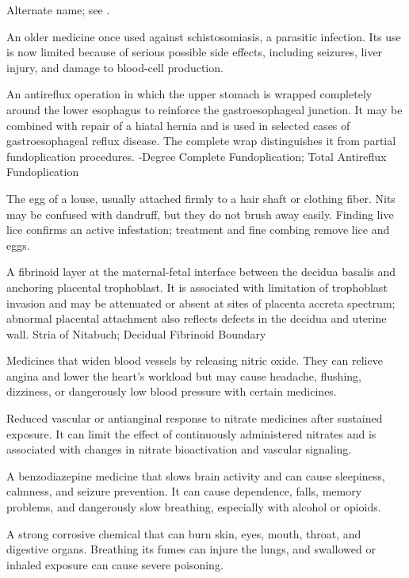  Alternate name; see .

 An older medicine once used against schistosomiasis, a parasitic infection. Its use is now limited because of serious possible side effects, including seizures, liver injury, and damage to blood-cell production.

 An antireflux operation in which the upper stomach is wrapped completely around the lower esophagus to reinforce the gastroesophageal junction. It may be combined with repair of a hiatal hernia and is used in selected cases of gastroesophageal reflux disease. The complete wrap distinguishes it from partial fundoplication procedures.
-Degree Complete Fundoplication; Total Antireflux Fundoplication

 The egg of a louse, usually attached firmly to a hair shaft or clothing fiber. Nits may be confused with dandruff, but they do not brush away easily. Finding live lice confirms an active infestation; treatment and fine combing remove lice and eggs.

 A fibrinoid layer at the maternal-fetal interface between the decidua basalis and anchoring placental trophoblast. It is associated with limitation of trophoblast invasion and may be attenuated or absent at sites of placenta accreta spectrum; abnormal placental attachment also reflects defects in the decidua and uterine wall.
\synonyms
Stria of Nitabuch; Decidual Fibrinoid Boundary

 Medicines that widen blood vessels by releasing nitric oxide. They can relieve angina and lower the heart's workload but may cause headache, flushing, dizziness, or dangerously low blood pressure with certain medicines.

 Reduced vascular or antianginal response to nitrate medicines after sustained exposure. It can limit the effect of continuously administered nitrates and is associated with changes in nitrate bioactivation and vascular signaling.


 A benzodiazepine medicine that slows brain activity and can cause sleepiness, calmness, and seizure prevention. It can cause dependence, falls, memory problems, and dangerously slow breathing, especially with alcohol or opioids.

 A strong corrosive chemical that can burn skin, eyes, mouth, throat, and digestive organs. Breathing its fumes can injure the lungs, and swallowed or inhaled exposure can cause severe poisoning.

